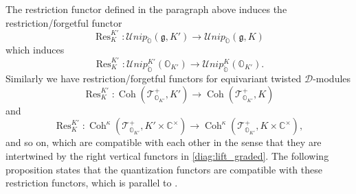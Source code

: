 \documentclass[11pt, a4paper]{amsart}
\newcommand{\C}{\mathbb{C}}
\newcommand{\g}{\mathfrak{g}}
\newcommand{\orb}{\mathbb{O}}
\newcommand{\ckorb}{\check{\orb}}
\newcommand{\cF}{\mathcal{F}}
\newcommand{\cL}{\mathcal{L}}
\newcommand{\cE}{\mathcal{E}}
\newcommand{\sD}{\mathscr{D}}
\newcommand{\hb}{\hbar}
\newcommand{\MV}{M^{\scriptscriptstyle V}}
\DeclareMathOperator{\Unip}{Unip}
\DeclareMathOperator{\Coh}{Coh}
\DeclareMathOperator{\res}{Res}
\newcommand{\UnipOv}{\Unip_{\ckorb}}
\newcommand{\cUnipOv}{\mathcal{U}nip_{\ckorb}}
\newcommand{\TT}{\mathscr{T}}
\newcommand{\quan}{\mathcal{Q}}
\newcommand{\cm}{\C^\times}
\newcommand{\OO}{\mathcal{O}}
\newcommand{\Irr}{\operatorname{Irr}}
\theoremstyle{definition}
\numberwithin{equation}{section}
\begin{document}

The restriction functor defined in the paragraph above  induces the restriction/forgetful functor 
	\[ \res_{K}^{K'}: \cUnipOv(\g,K') \to \cUnipOv(\g,K) \] 
which induces 
\[\res_{K}^{K'}: \cUnipOv^{K'}(\orb_{K'}) \to \cUnipOv^K(\orb_{K'}). \]
Similarly we have restriction/forgetful functors for equivariant twisted $\sD$-modules 
\[ \res_{K}^{K'}: \Coh(\TT^+_{\orb_{K'}},K') \to \Coh(\TT^+_{\orb_{K'}},K) \]
and
\[ \res_{K}^{K'}: \Coh^\kappa(\TT^+_{\orb_{K'}},K' \times \cm) \to \Coh^\kappa(\TT^+_{\orb_{K'}},K \times \cm), \]
and so on, which are compatible with each other in the sense that they are intertwined by the right vertical functors in \eqref{diag:lift_graded}. The following proposition states that the quantization functors are compatible with these restriction functors, which is parallel to .
\end{document}
